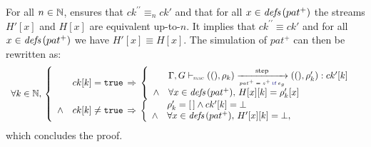 \begin{skippableproof}
    For all $n \in \mathbb{N}$,  ensures that
    $ck^{\prime\prime} \equiv_n ck'$ and that for all $x \in {\ensuremath{\textit{defs}\left(pat^+\right)}}$ the streams $H'[x]$ and
    $H[x]$ are equivalent up-to-$n$. It implies that $ck^{\prime\prime} \equiv ck'$ and for all $x
        \in {\ensuremath{\textit{defs}\left(pat^+\right)}}$ we have $H'[x] \equiv H[x]$. The simulation of $pat^+$ can then be
    rewritten as:
    \begin{equation*}
        \begin{array}{l}
            \forall k \in \N, \,
            \left\{
            \begin{array}{ll}
                       & ck[k] = \true \, \Rightarrow \,
                \left\{
                \begin{array}{ll}
                           & \patOpsem{\rho_k}{\guarded{pat^+ = s^+}{e_g}}{ck'[k]}{\rho'_k} \\
                    \wedge & \forall x \in \defs{pat^+}, \, H[x][k] = \rho'_k[x]            \\
                \end{array}
                \right.                                     \\
                \wedge & ck[k] \neq \true \, \Rightarrow \,
                \left\{
                \begin{array}{ll}
                           & \rho'_k = \emptyrho \wedge ck'[k] = \bot         \\
                    \wedge & \forall x \in \defs{pat^+}, \,  H'[x][k] = \bot, \\
                \end{array}
                \right.                                     \\
            \end{array}
            \right.
        \end{array}
    \end{equation*}
    which concludes the proof.

    \setcounter{paragraph}{0}
    \setcounter{subparagraph}{0}
\end{skippableproof}

